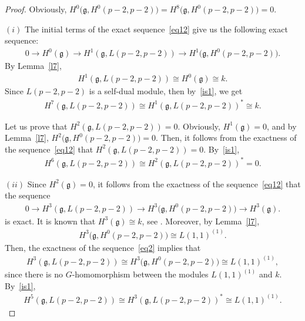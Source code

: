 \documentclass[10pt,a4paper]{amsart}
\numberwithin{equation}{section}
\begin{document}
\begin{proof} Obviously, $H^0\big(\mathfrak{g},H^0(p-2,p-2)\big)=H^8\big(\mathfrak{g},H^0(p-2,p-2)\big)=0$.

$(i)$ The initial terms of the exact sequence~\eqref{eq12} give us the following exact sequence:
\begin{gather*}0\longrightarrow H^0(\mathfrak{g})\longrightarrow H^1(\mathfrak{g},L(p-2,p-2))\longrightarrow H^1\big(\mathfrak{g},H^0(p-2,p-2)\big).\end{gather*} By Lemma~\ref{l7},
\begin{gather*}H^1(\mathfrak{g},L(p-2,p-2))\cong H^0(\mathfrak{g})\cong k.\end{gather*}
Since $L(p-2,p-2)$ is a self-dual module, then by~\eqref{is1}, we get
\begin{gather*}H^7(\mathfrak{g},L(p-2,p-2))\cong H^1(\mathfrak{g},L(p-2,p-2))^*\cong k.
\end{gather*}

Let us prove that $H^2(\mathfrak{g},L(p-2,p-2))=0$. Obviously, $H^1(\mathfrak{g})=0$, and by Lemma~\ref{l7}, $H^2\big(\mathfrak{g},H^0(p-2,p-2)\big)=0$. Then, it follows from the exactness of the sequence~\eqref{eq12} that $H^2(\mathfrak{g},L(p-2,p-2))=0$. By~\eqref{is1},
\begin{gather*}H^6(\mathfrak{g},L(p-2,p-2))\cong H^2(\mathfrak{g},L(p-2,p-2))^*=0.\end{gather*}

$(ii)$ Since $H^2(\mathfrak{g})=0$, it follows from the exactness of the sequence~\eqref{eq12} that the sequence
\begin{gather} 0\longrightarrow H^3(\mathfrak{g},L(p-2,p-2))\longrightarrow H^3\big(\mathfrak{g},H^0(p-2,p-2)\big)\longrightarrow H^3(\mathfrak{g}).\label{eq2}
\end{gather}
is exact. It is known that $H^3(\mathfrak{g})\cong k$, see \cite[p.~113]{CheE48}. Moreover, by Lemma~\ref{l7},
\begin{gather*}
H^3\big(\mathfrak{g},H^0(p-2,p-2)\big)\cong L(1,1)^{(1)}.
\end{gather*}
Then, the exactness of the sequence~\eqref{eq2} implies that
\begin{gather*}
H^3(\mathfrak{g},L(p-2,p-2))\cong H^3\big(\mathfrak{g},H^0(p-2,p-2)\big)\cong L(1,1)^{(1)},
\end{gather*}
since there is no $G$-homomorphism between the modules $L(1,1)^{(1)}$ and $k$. By~\eqref{is1},
\begin{gather*}H^5(\mathfrak{g},L(p-2,p-2))\cong H^3(\mathfrak{g},L(p-2,p-2))^*\cong L(1,1)^{(1)}.
\end{gather*}


\end{proof}
\end{document}
